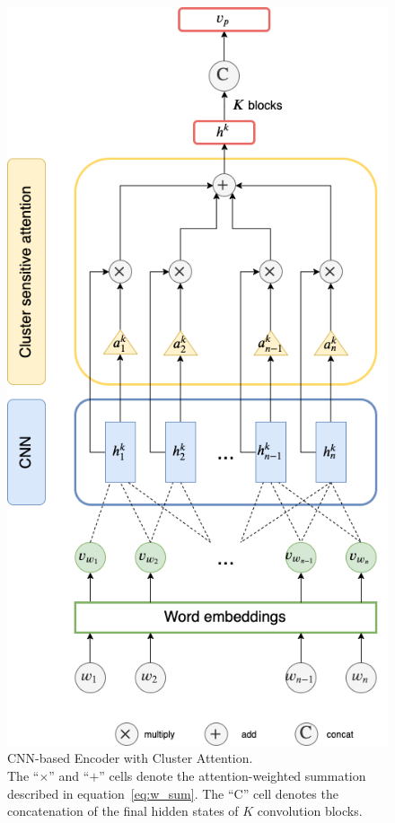 \documentclass{bmcart}
\begin{document}
\begin{backmatter}
\begin{figure}[h!]
    \includegraphics[scale=0.5]{cnn.png}
    \caption{CNN-based Encoder with Cluster Attention. \\ The ``$\times$'' and ``$+$'' cells denote the attention-weighted summation described in equation~\ref{eq:w_sum}. The ``$\text{C}$'' cell denotes the concatenation of the final hidden states of $K$ convolution blocks.}

\end{figure}
\end{backmatter}
\end{document}
